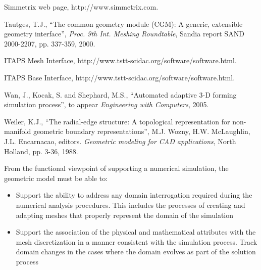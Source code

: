 \documentclass{article}
\begin{document}
\begin{thebibliography}{99}
 Simmetrix web page, http://www.simmetrix.com.

 Tautges, T.J., ``The common geometry module (CGM): A 
generic, extensible geometry interface'', \textit{Proc. 9th Int. 
Meshing Roundtable}, Sandia report SAND 2000-2207, pp. 337-359, 
2000.

 ITAPS Mesh Interface, http://www.tstt-scidac.org/software/software.html.

ITAPS Base Interface, http://www.tstt-scidac.org/software/software.html.


 Wan, J., Kocak, S. and Shephard, M.S., ``Automated adaptive 
3-D forming simulation process'', to appear \textit{Engineering 
with Computers}, 2005.

 Weiler, K.J., ``The radial-edge structure: A topological 
representation for non-manifold geometric boundary representations'', 
M.J. Wozny, H.W. McLaughlin, J.L. Encarnacao, editors. \textit{Geometric 
modeling for CAD applications}, North Holland, pp. 3-36, 1988.

\end{thebibliography}


\newpage
\begin{Large}
\hspace{-16pt}{Appendix I: The Geometric Model\\}    %
\end{Large}
\vspace{.2in}

From the functional viewpoint of supporting a numerical simulation, 
the geometric model must be able to:

\begin{itemize}
\item Support the ability to address any domain interrogation 
required during the numerical analysis procedures. This includes 
the processes of creating and adapting meshes that properly represent 
the domain of the simulation

\item Support the association of the physical and mathematical 
attributes with the mesh discretization in a manner consistent 
with the simulation process. Track domain changes in the cases 
where the domain evolves as part of the solution process
\end{itemize}
\end{document}
